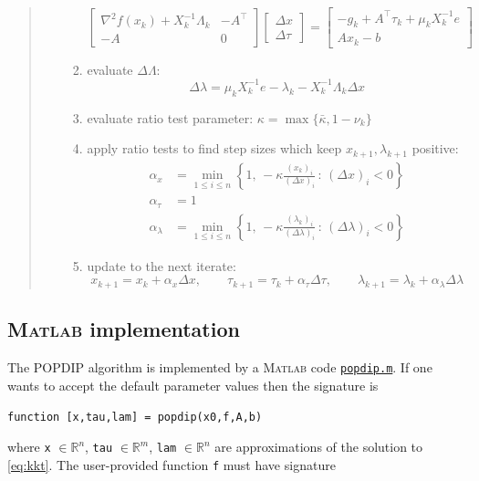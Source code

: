\documentclass[11pt]{article}
\newcommand{\RR}{\mathbb{R}}
\newcommand{\grad}{\nabla}
\newcommand{\Matlab}{\textsc{Matlab}\xspace}
\begin{document}
\begin{quote}
\begin{itemize}
\begin{enumerate}
    $$\begin{bmatrix}
\grad^2 f(x_k) + X_k^{-1}\Lambda_k & -A^\top \\
-A             & 0
\end{bmatrix}
\begin{bmatrix}
\Delta x \\
\Delta \tau
\end{bmatrix}
=
\begin{bmatrix}
-g_k + A^\top \tau_k + \mu_k X_k^{-1} e \\
A x_k - b
\end{bmatrix}$$
    \item evaluate $\Delta\Lambda$:
    $$\Delta\lambda = \mu_k X_k^{-1} e - \lambda_k - X_k^{-1} \Lambda_k \Delta x$$
    \item evaluate ratio test parameter: $\kappa = \max\{\bar\kappa,1-\nu_k\}$
    \item apply ratio tests to find step sizes which keep $x_{k+1},\lambda_{k+1}$ positive:
\begin{align*}
\alpha_x &= \min_{1\le i\le n} \left\{1, \,-\kappa \frac{(x_k)_i}{(\Delta x)_i} \,:\, (\Delta x)_i < 0\right\} \\
\alpha_\tau &= 1 \\
\alpha_\lambda &= \min_{1\le i\le n} \left\{1, \,-\kappa \frac{(\lambda_k)_i}{(\Delta \lambda)_i} \,:\, (\Delta \lambda)_i < 0\right\}
\end{align*}
    \item update to the next iterate:
   $$x_{k+1} = x_k + \alpha_x \Delta x, \qquad \tau_{k+1} = \tau_k + \alpha_\tau \Delta \tau, \qquad \lambda_{k+1} = \lambda_k + \alpha_\lambda \Delta \lambda$$
    \end{enumerate}
\end{itemize}
\end{quote}


\subsection*{\Matlab implementation}

The POPDIP algorithm is implemented by a \Matlab code \href{https://github.com/bueler/popdip/blob/main/matlab/popdip.m}{\texttt{popdip.m}}.  If one wants to accept the default parameter values then the signature is

\medskip
\centerline{\texttt{function [x,tau,lam] = popdip(x0,f,A,b)}}

\medskip
\noindent where \texttt{x} $\in\RR^n$, \texttt{tau} $\in\RR^m$, \texttt{lam} $\in\RR^n$ are approximations of the solution to \eqref{eq:kkt}.  The user-provided function \texttt{f} must have signature
\end{document}
